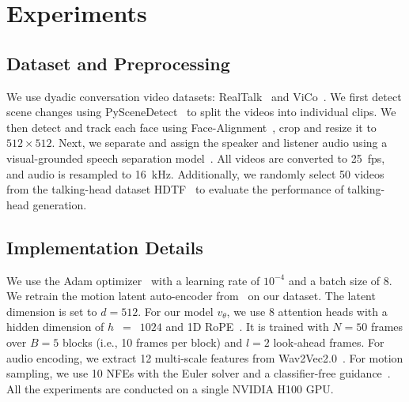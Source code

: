 


\section{Experiments}\label{sec:expriments}
\subsection{Dataset and Preprocessing}
We use dyadic conversation video datasets: RealTalk~\citep{realtalk} and ViCo~\citep{rlhg}. We first detect scene changes using PySceneDetect~\citep{pyscenedetect} to split the videos into individual clips. We then detect and track each face using Face-Alignment~\citep{face_alignment}, crop and resize it to $512{\times}512$. Next, we separate and assign the speaker and listener audio using a visual-grounded speech separation model~\citep{iianet}. All videos are converted to 25~fps, and audio is resampled to 16~kHz. Additionally, we randomly select 50 videos from the talking-head dataset HDTF~\citep{hdtf} to evaluate the performance of talking-head generation.

\subsection{Implementation Details} 
We use the Adam optimizer~\citep{adam} with a learning rate of $10^{-4}$ and a batch size of 8. We retrain the motion latent auto-encoder from~\citet{float} on our dataset. The latent dimension is set to $d=512$. For our model $v_\theta$, we use 8 attention heads with a hidden dimension of $h$~$=$~$1024$ and 1D RoPE~\citep{rope}. It is trained with $N=50$ frames over $B=5$ blocks (i.e., 10 frames per block) and $l=2$ look-ahead frames. For audio encoding, we extract 12 multi-scale features from Wav2Vec2.0~\citep{wav2vec2}.
For motion sampling, we use 10 NFEs with the Euler solver and a classifier-free guidance~\citep{classifier_free}. All the experiments are conducted on a single NVIDIA H100 GPU.

